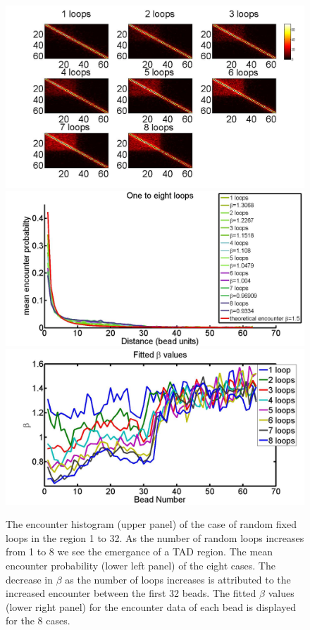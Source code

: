 \documentclass[12pt]{book}
\begin{document}
\begin{figure}[H]
\centering
\includegraphics[scale=0.25]{encounterHistogram_1to8Loops}
\includegraphics[scale=0.12]{meanEncounterProbabilityOneTAD1To8Loops}
\includegraphics[scale=0.12]{fittedExpOneTAD1To8Loops}
\caption{\scriptsize{The encounter histogram (upper panel) of the case of random fixed loops in the region 1 to 32. As the number of random loops increases from 1 to 8 we see the emergance of a TAD region. The mean encounter probability (lower left panel) of the eight cases. The decrease in $\beta$ as the number of loops increases is attributed to the increased encounter between the first 32 beads. The fitted $\beta$ values (lower right panel) for the encounter data of each bead is displayed for the 8 cases.}}
\end{figure}
\end{document}
